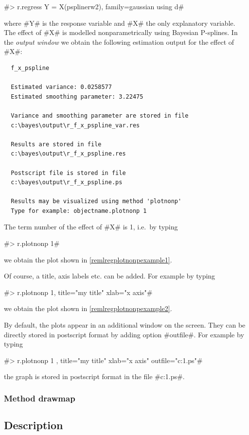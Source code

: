 #> r.regress Y = X(psplinerw2), family=gaussian using d#

where #Y# is the response variable and #X# the only explanatory
variable. The effect of #X# is modelled nonparametrically  using
Bayesian P-splines. In the {\em output window} we obtain the
following estimation output for the effect of #X#:

\begin{verbatim}
  f_x_pspline

  Estimated variance: 0.0258577
  Estimated smoothing parameter: 3.22475

  Variance and smoothing parameter are stored in file
  c:\bayes\output\r_f_x_pspline_var.res

  Results are stored in file
  c:\bayes\output\r_f_x_pspline.res

  Postscript file is stored in file
  c:\bayes\output\r_f_x_pspline.ps

  Results may be visualized using method 'plotnonp'
  Type for example: objectname.plotnonp 1
\end{verbatim}

The term number of the effect of #X# is 1, i.e.~by typing

#> r.plotnonp 1#

we obtain the plot shown in \autoref{remlregplotnonpexample1}.

Of course, a title, axis labels etc. can be added. For example by
typing

#> r.plotnonp 1, title="my title" xlab="x axis"#

we obtain the plot shown in \autoref{remlregplotnonpexample2}.

By default, the plots appear in an additional window on the
screen. They can be directly stored in postscript format by adding
option #outfile#. For example by typing

 #> r.plotnonp 1 , title="my title" xlab="x axis" outfile="c:\results\result1.ps"#

the graph is stored in postscript format in the file
#c:\results\result1.ps#.

\subsubsection{Method drawmap}
\label{remlregdrawmap} 
 

\subsection*{Description}

